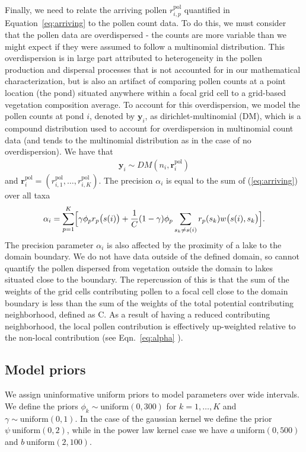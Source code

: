 \documentclass[12pt]{article}
\begin{document}
Finally, we need to relate the arriving pollen $r_{i,p}^{\text{pol}}$
quantified in Equation~\ref{eq:arriving} to the pollen count data. To
do this, we must consider that the pollen data are overdispersed - the
counts are more variable than we might expect if they were assumed to
follow a multinomial distribution. This overdispersion is in large
part attributed to heterogeneity in the pollen production and
dispersal processes that is not accounted for in our mathematical
characterization, but is also an artifact of comparing pollen counts
at a point location (the pond) situated anywhere within a focal grid
cell to a grid-based vegetation composition average. To account for
this overdispersion, we model the pollen counts at pond $i$, denoted
by $\bm{y}_i$, as dirichlet-multinomial (DM), which is a compound
distribution used to account for overdispersion in multinomial count
data (and tends to the multinomial distribution as in the case of no
overdispersion). We have that
\begin{align}
\bm{y}_i \sim DM (n_i, \bm{r}_i^{\text{pol}})
\label{eq:DM}
\end{align}
and $\bm{r}_i^{\text{pol}} = (r_{i,1}^{\text{pol}}, \ldots,
r_{i,K}^{\text{pol}})$.  The precision $\alpha_i$ is equal to the sum
of (\ref{eq:arriving}) over all taxa
\begin{align}
\alpha_i = \sum_{p=1}^K \Bigl[\gamma \phi_p r_p\bigl(s(i)\bigr) + \frac{1}{C} (1-\gamma) \phi_p \sum_{s_k \neq s(i) } r_p(s_k) w\bigl(s(i), s_k\bigr)\Bigr].
\label{eq:alpha}
\end{align}
The precision parameter $\alpha_i$ is also affected by the proximity
of a lake to the domain boundary. We do not have data outside of the
defined domain, so cannot quantify the pollen dispersed from
vegetation outside the domain to lakes situated close to the
boundary. The repercussion of this is that the sum of the weights of
the grid cells contributing pollen to a focal cell close to the domain
boundary is less than the sum of the weights of the total potential
contributing neighborhood, defined as C. As a result of having a
reduced contributing neighborhood, the local pollen contribution is
effectively up-weighted relative to the non-local contribution (see
Eqn.~\ref{eq:alpha} ).

\subsection{Model priors}

We assign uninformative uniform priors to model parameters over wide
intervals. We define the priors $\phi_k \sim \text{uniform}(0, 300)$ for
$k=1, \ldots, K$ and $\gamma \sim \text{uniform}(0,1)$. In the case of the
gaussian kernel we define the prior $\psi ~ \text{uniform}(0, 2)$, while in
the power law kernel case we have $a ~ \text{uniform}(0, 500)$ and
$b~\text{uniform}(2, 100)$.
\end{document}
